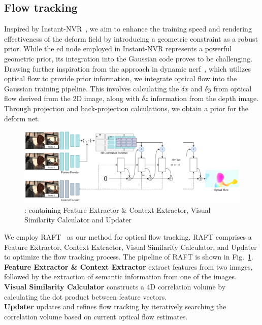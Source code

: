 \subsection{Flow tracking}
Inspired by Instant-NVR~\cite{jiang2023instantnvr}, we aim to enhance the training speed and rendering effectiveness of the deform field by introducing a geometric constraint as a robust prior. While the ed node employed in Instant-NVR represents a powerful geometric prior, its integration into the Gaussian code proves to be challenging. Drawing further inspiration from the approach in dynamic nerf~\cite{gao2021dynamic}, which utilizes optical flow to provide prior information, we integrate optical flow into the Gaussian training pipeline. This involves calculating the $\delta x$ and $\delta y$ from optical flow derived from the 2D image, along with $\delta z$ information from the depth image. Through projection and back-projection calculations, we obtain a prior for the deform net.
\begin{figure}[t] 
	\begin{center} 
		\includegraphics[width=\linewidth]{sec/fig/RAFT.png} 
	\end{center} 
    \vspace{-20pt}
    \caption{: containing Feature Extractor \& Context Extractor, Visual Similarity Calculator and Updater}
    \label{fig:hello}
\end{figure}
We employ RAFT~\cite{10.1007/978-3-030-58536-5_24} as our method for optical flow tracking. RAFT comprises a Feature Extractor, Context Extractor, Visual Similarity Calculator, and Updater to optimize the flow tracking process. The pipeline of RAFT is shown in Fig.~\ref{fig:hello}.
\\
\textbf{Feature Extractor \& Context Extractor } extract features from two images, followed by the extraction of semantic information from one of the images.
\\
\textbf{Visual Similarity Calculator }constructs a 4D correlation volume by calculating the dot product between feature vectors.
\\
\textbf{Updater }updates and refines flow tracking by iteratively searching the correlation volume based on current optical flow estimates.

